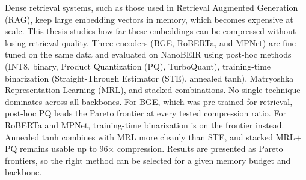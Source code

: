 \doublespacing
Dense retrieval systems, such as those used in Retrieval Augmented Generation (RAG), keep large embedding vectors in memory, which becomes expensive at scale. This thesis studies how far these embeddings can be compressed without losing retrieval quality. Three encoders (BGE, RoBERTa, and MPNet) are fine-tuned on the same data and evaluated on NanoBEIR using post-hoc methods (INT8, binary, Product Quantization (PQ), TurboQuant), training-time binarization (Straight-Through Estimator (STE), annealed tanh), Matryoshka Representation Learning (MRL), and stacked combinations. No single technique dominates across all backbones. For BGE, which was pre-trained for retrieval, post-hoc PQ leads the Pareto frontier at every tested compression ratio. For RoBERTa and MPNet, training-time binarization is on the frontier instead. Annealed tanh combines with MRL more cleanly than STE, and stacked MRL$+$PQ remains usable up to 96$\times$ compression. Results are presented as Pareto frontiers, so the right method can be selected for a given memory budget and backbone.

\clearpage


